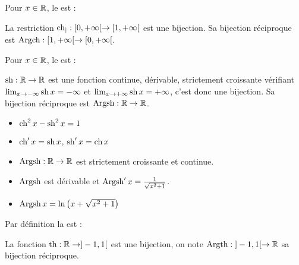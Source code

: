 \documentclass[10pt,class=article,crop=false]{standalone}
\begin{document}
\begin{multicols}{2}

Pour $x\in \mathbb{R}$, le  est :

La restriction $\operatorname{ch}_| : [0,+\infty[ \to [1,+\infty[$ est une bijection.
Sa bijection réciproque est $\operatorname{Argch} : [1,+\infty[ \to [0,+\infty[$.






Pour $x\in \mathbb{R}$, le  est :

$\operatorname{sh} : \mathbb{R} \to \mathbb{R}$ est une fonction continue, dérivable, strictement
croissante vérifiant $\lim_{x\to -\infty} \operatorname{sh} x = -\infty$
et $\lim_{x\to +\infty} \operatorname{sh} x = +\infty$, c'est donc une bijection.
Sa bijection réciproque est $\operatorname{Argsh} : \mathbb{R} \to \mathbb{R}$.

\begin{proposition}
	\sauteligne
	\begin{itemize}
		\item $\operatorname{ch}^2 x - \operatorname{sh}^2 x =1$
		\item $\operatorname{ch}' x = \operatorname{sh} x$, $\operatorname{sh}'x = \operatorname{ch} x$
		\item $\operatorname{Argsh} : \mathbb{R} \to \mathbb{R}$ est strictement croissante et continue.
		\item $\operatorname{Argsh}$ est dérivable  et $\operatorname{Argsh}'x=\frac{1}{\sqrt{x^2+1}}$.
		\item $\operatorname{Argsh} x = \ln\big(x+ \sqrt{x^2+1}\big)$
	\end{itemize}
\end{proposition}





Par définition la  est :

La fonction $\operatorname{th} : \mathbb{R} \to ]-1,1[$ est une bijection, on note
$\operatorname{Argth} : {}]-1,1[\to\mathbb{R}$ sa bijection réciproque.

%



\end{multicols}
\end{document}
